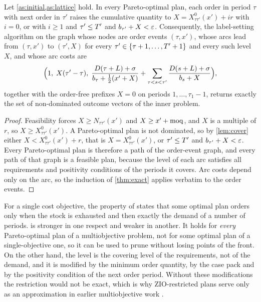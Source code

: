 \begin{theorem}\label{thm:event}
  Let \cref{as:initial,as:lattice} hold. In every Pareto-optimal plan, each order in period
  $\tau$ with next order in $\tau'$ raises the cumulative quantity to
  $X=X^0_{\tau\tau'}(x')+ir$ with $i=0$, or with $i\ge1$ and $\tau'\le T'$ and
  $b_{\tau'}+X<\varepsilon$. Consequently, the label-setting algorithm on the graph whose nodes are
  order events $(\tau,x')$, whose arcs lead from $(\tau,x')$ to $(\tau',X)$ for every
  $\tau'\in\{\tau+1,\dots,T'+1\}$ and every such level $X$, and whose arc costs are
  \begin{equation}
    \Bigl(1,\;X(\tau'-\tau),\;\frac{D(\tau+L)+\sigma}{b_\tau+\frac12(x'+X)}
      +\sum_{\tau<s<\tau'}\frac{D(s+L)+\sigma}{b_s+X}\Bigr),
  \end{equation}
  together with the order-free prefixes $X=0$ on periods $1,\dots,\tau_1-1$, returns exactly
  the set of non-dominated outcome vectors of the inner problem.
\end{theorem}

\begin{proof}
  Feasibility forces $X\ge N_{\tau\tau'}(x')$ and $X\ge x'+\mathrm{moq}$, and $X$ is a multiple of
  $r$, so $X\ge X^0_{\tau\tau'}(x')$. A Pareto-optimal plan is not dominated, so by
  \cref{lem:cover} either $X<X^0_{\tau\tau'}(x')+r$, that is $X=X^0_{\tau\tau'}(x')$, or
  $\tau'\le T'$ and $b_{\tau'}+X<\varepsilon$. Every Pareto-optimal plan is therefore a path of the
  order-event graph, and every path of that graph is a feasible plan, because the level of
  each arc satisfies all requirements and positivity conditions of the periods it covers.
  Arc costs depend only on the arc, so the induction of \cref{thm:exact} applies verbatim
  to the order events.
\end{proof}

\begin{remark}
  For a single cost objective, the property of \citet{WagnerWhitin1958} states that some
  optimal plan orders only when the stock is exhausted and then exactly the demand of a
  number of periods.  is stronger in one respect and weaker in another. It
  holds for \emph{every} Pareto-optimal plan of a multiobjective problem, not for some
  optimal plan of a single-objective one, so it can be used to prune without losing points
  of the front. On the other hand, the level is the covering level of the requirements, not
  of the demand, and it is modified by the minimum order quantity, by the case pack and by
  the positivity condition of the next order period. Without these modifications the
  restriction would not be exact, which is why ZIO-restricted plans serve only as an
  approximation in earlier multiobjective work \citep{Gutierrez2004}.
\end{remark}


